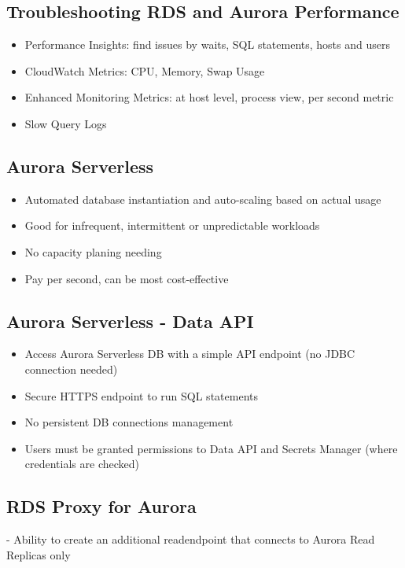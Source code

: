 \subsection{Troubleshooting RDS and Aurora Performance}
\begin{itemize}
    \item Performance Insights: find issues by waits, SQL statements, hosts and users
    \item CloudWatch Metrics: CPU, Memory, Swap Usage
    \item Enhanced Monitoring Metrics: at host level, process view, per second metric
    \item Slow Query Logs
\end{itemize}

\subsection{Aurora Serverless}
\begin{itemize}
    \item Automated database instantiation and auto-scaling based on actual usage
    \item Good for infrequent, intermittent or unpredictable workloads
    \item No capacity planing needing
    \item Pay per second, can be most cost-effective
\end{itemize}

\subsection{Aurora Serverless - Data API}
\begin{itemize}
    \item Access Aurora Serverless DB with a simple API endpoint (no JDBC connection needed)
    \item Secure HTTPS endpoint to run SQL statements
    \item No persistent DB connections management
    \item Users must be granted permissions to Data API and Secrets Manager (where credentials are checked)
\end{itemize}

\subsection{RDS Proxy for Aurora}
- Ability to create an additional read\itemonly endpoint that connects to Aurora Read Replicas only

